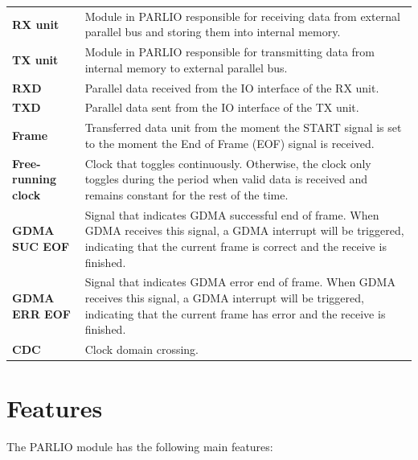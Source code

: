 \documentclass[main\_\_EN.tex]{subfiles}
\begin{document}
\begin{longtable}[c]{ R{4cm} p{10cm} }
\textbf{RX unit}            & Module in PARLIO responsible for receiving data from external parallel bus and storing them into internal memory. \\
\textbf{TX unit}            & Module in PARLIO responsible for transmitting data from internal memory to external parallel bus. \\
\textbf{RXD}                & Parallel data received from the IO interface of the RX unit. \\
\textbf{TXD}                & Parallel data sent from the IO interface of the TX unit. \\
\textbf{Frame}              & Transferred data unit from the moment the START signal is set to the moment the End of Frame (EOF) signal is received. \\
\textbf{Free-running clock} & Clock that toggles continuously. Otherwise, the clock only toggles during the period when valid data is received and remains constant for the rest of the time.\\
\textbf{GDMA SUC EOF}       & Signal that indicates GDMA successful end of frame. When GDMA receives this signal, a GDMA interrupt will be triggered, indicating that the current frame is correct and the receive is finished.\\
\textbf{GDMA ERR EOF}       & Signal that indicates GDMA error end of frame. When GDMA receives this signal, a GDMA interrupt will be triggered, indicating that the current frame has error and the receive is finished.\\
\textbf{CDC}                & Clock domain crossing.\\

\end{longtable}



\section{Features}
\label{sec:parlio-features}

The PARLIO module has the following main features:
\end{document}
